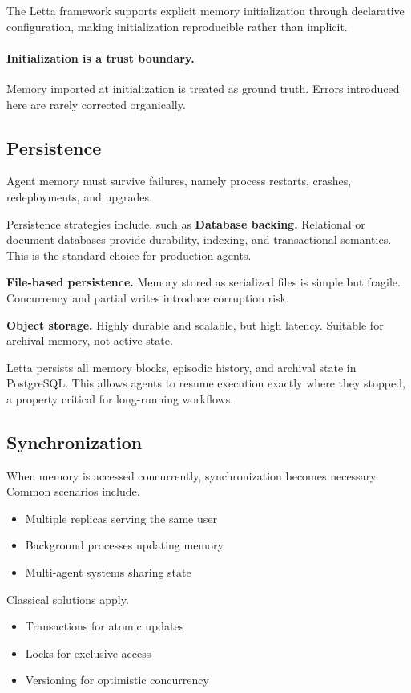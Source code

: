The Letta framework supports explicit memory initialization through declarative configuration, making initialization reproducible rather than implicit.

\paragraph{Initialization is a trust boundary.}
Memory imported at initialization is treated as ground truth. Errors introduced here are rarely corrected organically.

\subsection{Persistence}

Agent memory must survive failures, namely process restarts, crashes, redeployments, and upgrades.

Persistence strategies include, such as \textbf{Database backing.}
Relational or document databases provide durability, indexing, and transactional semantics. This is the standard choice for production agents.

\textbf{File-based persistence.}
Memory stored as serialized files is simple but fragile. Concurrency and partial writes introduce corruption risk.

\textbf{Object storage.}
Highly durable and scalable, but high latency. Suitable for archival memory, not active state.

Letta persists all memory blocks, episodic history, and archival state in PostgreSQL. This allows agents to resume execution exactly where they stopped, a property critical for long-running workflows.

\subsection{Synchronization}

When memory is accessed concurrently, synchronization becomes necessary. Common scenarios include.
\begin{itemize}
\item Multiple replicas serving the same user
\item Background processes updating memory
\item Multi-agent systems sharing state
\end{itemize}

Classical solutions apply.
\begin{itemize}
\item Transactions for atomic updates
\item Locks for exclusive access
\item Versioning for optimistic concurrency
\end{itemize}

